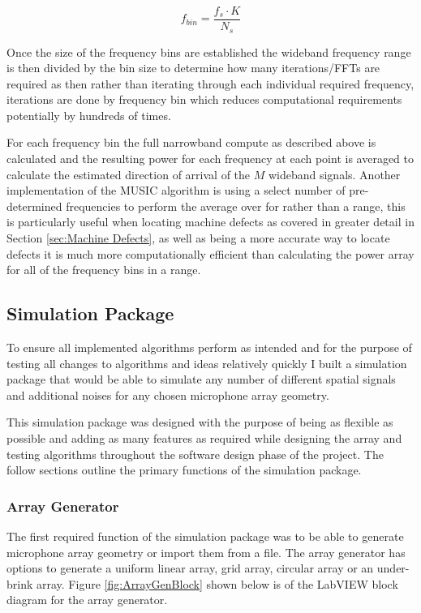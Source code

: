 \documentclass{UoNMCHA}
\numberwithin{equation}{section}
\begin{document}
    \begin{equation}
        f_{bin} =\frac{f_s \cdot K}{N_s}
    \end{equation}
    
    Once the size of the frequency bins are established the wideband frequency range is then divided by the bin size to determine how many iterations/FFTs are required as then rather than iterating through each individual required frequency, iterations are done by frequency bin which reduces computational requirements potentially by hundreds of times. 
    
    For each frequency bin the full narrowband compute as described above is calculated and the resulting power for each frequency at each point is averaged to calculate the estimated direction of arrival of the $M$ wideband signals. Another implementation of the MUSIC algorithm is using a select number of pre-determined frequencies to perform the average over for rather than a range, this is particularly useful when locating machine defects as covered in greater detail in Section \ref{sec:Machine Defects}, as well as being a more accurate way to locate defects it is much more computationally efficient than calculating the power array for all of the frequency bins in a range. 
\subsection{Simulation Package} \label{sec:Software Sim}
    
    To ensure all implemented algorithms perform as intended and for the purpose of testing all changes to algorithms and ideas relatively quickly I built a simulation package that would be able to simulate any number of different spatial signals and additional noises for any chosen microphone array geometry.
    
    This simulation package was designed with the purpose of being as flexible as possible and adding as many features as required while designing the array and testing algorithms throughout the software design phase of the project. The follow sections outline the primary functions of the simulation package.
\subsubsection{Array Generator} \label{sec:Array Generator}
    The first required function of the simulation package was to be able to generate microphone array geometry or import them from a file. The array generator has options to generate a uniform linear array, grid array, circular array or an under-brink array. Figure \ref{fig:ArrayGenBlock} shown below is of the LabVIEW block diagram for the array generator.
    
\end{document}
